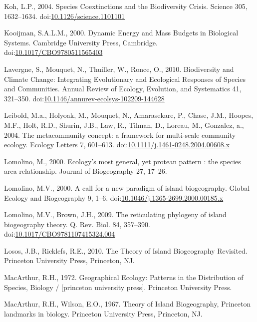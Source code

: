 \hypertarget{ref-Koh2004}{}
Koh, L.P., 2004. Species Coextinctions and the Biodiversity Crisis.
Science 305, 1632--1634.
doi:\href{https://doi.org/10.1126/science.1101101}{10.1126/science.1101101}

\hypertarget{ref-Kooijman2000a}{}
Kooijman, S.A.L.M., 2000. Dynamic Energy and Mass Budgets in Biological
Systems. Cambridge University Press, Cambridge.
doi:\href{https://doi.org/10.1017/CBO9780511565403}{10.1017/CBO9780511565403}

\hypertarget{ref-Lavergne2010}{}
Lavergne, S., Mouquet, N., Thuiller, W., Ronce, O., 2010. Biodiversity
and Climate Change: Integrating Evolutionary and Ecological Responses of
Species and Communities. Annual Review of Ecology, Evolution, and
Systematics 41, 321--350.
doi:\href{https://doi.org/10.1146/annurev-ecolsys-102209-144628}{10.1146/annurev-ecolsys-102209-144628}

\hypertarget{ref-Leibold2004}{}
Leibold, M.a., Holyoak, M., Mouquet, N., Amarasekare, P., Chase, J.M.,
Hoopes, M.F., Holt, R.D., Shurin, J.B., Law, R., Tilman, D., Loreau, M.,
Gonzalez, a., 2004. The metacommunity concept: a framework for
multi-scale community ecology. Ecology Letters 7, 601--613.
doi:\href{https://doi.org/10.1111/j.1461-0248.2004.00608.x}{10.1111/j.1461-0248.2004.00608.x}

\hypertarget{ref-Lomolino2000a}{}
Lomolino, M., 2000. Ecology's most general, yet protean pattern : the
species area relationship. Journal of Biogeography 27, 17--26.

\hypertarget{ref-Lomolino2000}{}
Lomolino, M.V., 2000. A call for a new paradigm of island biogeography.
Global Ecology and Biogeography 9, 1--6.
doi:\href{https://doi.org/10.1046/j.1365-2699.2000.00185.x}{10.1046/j.1365-2699.2000.00185.x}

\hypertarget{ref-Lomolino2009}{}
Lomolino, M.V., Brown, J.H., 2009. The reticulating phylogeny of island
biogeography theory. Q. Rev. Biol. 84, 357--390.
doi:\href{https://doi.org/10.1017/CBO9781107415324.004}{10.1017/CBO9781107415324.004}

\hypertarget{ref-Losos2010}{}
Losos, J.B., Ricklefs, R.E., 2010. The Theory of Island Biogeography
Revisited. Princeton University Press, Princeton, NJ.

\hypertarget{ref-macarthur1972geographical}{}
MacArthur, R.H., 1972. Geographical Ecology: Patterns in the
Distribution of Species, Biology / {[}princeton university press{]}.
Princeton University Press.

\hypertarget{ref-MacArthur1967}{}
MacArthur, R.H., Wilson, E.O., 1967. Theory of Island Biogeography,
Princeton landmarks in biology. Princeton University Press, Princeton,
NJ.

